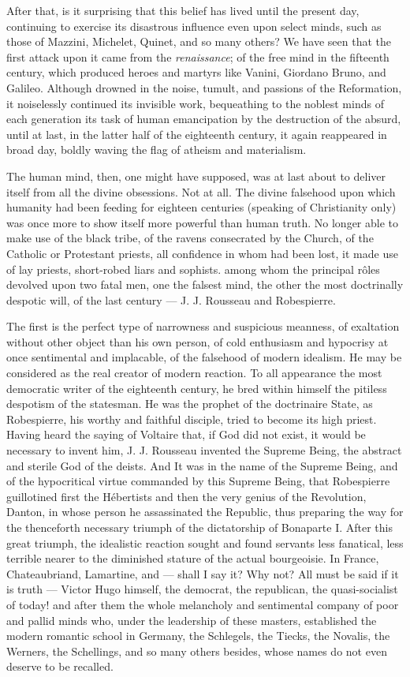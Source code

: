 \documentclass[12pt]{report}
\begin{document}
After that, is it surprising that this belief has lived until the present day, continuing to exercise its disastrous influence even upon select minds, such as those of Mazzini, Michelet, Quinet, and so many others? We have seen that the first attack upon it came from the \emph{renaissance}; of the free mind in the fifteenth century, which produced heroes and martyrs like Vanini, Giordano Bruno, and Galileo. Although drowned in the noise, tumult, and passions of the Reformation, it noiselessly continued its invisible work, bequeathing to the noblest minds of each generation its task of human emancipation by the destruction of the absurd, until at last, in the latter half of the eighteenth century, it again reappeared in broad day, boldly waving the flag of atheism and materialism.


The human mind, then, one might have supposed, was at last about to deliver itself from all the divine obsessions. Not at all. The divine falsehood upon which humanity had been feeding for eighteen centuries (speaking of Christianity only) was once more to show itself more powerful than human truth. No longer able to make use of the black tribe, of the ravens consecrated by the Church, of the Catholic or Protestant priests, all confidence in whom had been lost, it made use of lay priests, short-robed liars and sophists. among whom the principal rôles devolved upon two fatal men, one the falsest mind, the other the most doctrinally despotic will, of the last century — J. J. Rousseau and Robespierre.


The first is the perfect type of narrowness and suspicious meanness, of exaltation without other object than his own person, of cold enthusiasm and hypocrisy at once sentimental and implacable, of the falsehood of modern idealism. He may be considered as the real creator of modern reaction. To all appearance the most democratic writer of the eighteenth century, he bred within himself the pitiless despotism of the statesman. He was the prophet of the doctrinaire State, as Robespierre, his worthy and faithful disciple, tried to become its high priest. Having heard the saying of Voltaire that, if God did not exist, it would be necessary to invent him, J. J. Rousseau invented the Supreme Being, the abstract and sterile God of the deists. And It was in the name of the Supreme Being, and of the hypocritical virtue commanded by this Supreme Being, that Robespierre guillotined first the Hébertists and then the very genius of the Revolution, Danton, in whose person he assassinated the Republic, thus preparing the way for the thenceforth necessary triumph of the dictatorship of Bonaparte I. After this great triumph, the idealistic reaction sought and found servants less fanatical, less terrible nearer to the diminished stature of the actual bourgeoisie. In France, Chateaubriand, Lamartine, and — shall I say it? Why not? All must be said if it is truth — Victor Hugo himself, the democrat, the republican, the quasi-socialist of today! and after them the whole melancholy and sentimental company of poor and pallid minds who, under the leadership of these masters, established the modern romantic school in Germany, the Schlegels, the Tiecks, the Novalis, the Werners, the Schellings, and so many others besides, whose names do not even deserve to be recalled.
\end{document}
